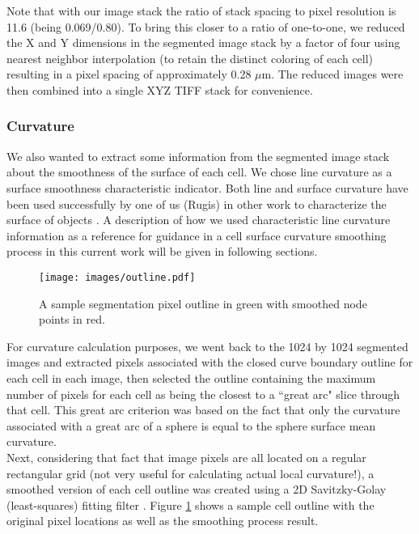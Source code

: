 \documentclass[a4paper,10pt]{article}
\begin{document}
Note that with our image stack the ratio of stack spacing to pixel resolution is 11.6 (being 0.069/0.80). To bring this closer to a ratio of one-to-one, we reduced the X and Y dimensions in the segmented image stack by a factor of four using nearest neighbor interpolation (to retain the distinct coloring of each cell) resulting in a pixel spacing of approximately 0.28 $\mu$m.  The reduced images were then combined into a single XYZ TIFF stack for convenience.\\

\subsubsection{Curvature}

We also wanted to extract some information from the segmented image stack about the smoothness of the surface of each cell. We chose line curvature as a surface smoothness characteristic indicator. Both line and surface curvature have been used successfully  by one of us (Rugis) in other work to characterize the surface of objects \cite{Rugis_2005_SCMMD, Rugis_2006_SRMRSD, Rugis_2006_SISCE}. A description of how we used characteristic line curvature information as a reference for guidance in a cell surface curvature smoothing process in this current work will be given in following sections.\\

\begin{figure}[H]
\begin{center}
\texttt{[image: images/outline.pdf]}
\end{center}
\vspace{-5mm}
\caption{A sample segmentation pixel outline in green with smoothed node points in red.}
\label{fig:slice_outline}
\end{figure}

For curvature calculation purposes, we went back to the 1024 by 1024 segmented images and extracted pixels associated with the closed curve boundary outline for each cell in each  image, then selected the outline containing the maximum number of pixels for each cell as being the closest to a ``great arc" slice through that cell. This great arc criterion was based on the fact that only the curvature associated with a great arc of a sphere is equal to the sphere surface mean curvature.\\

Next, considering that fact that image pixels are all located on a regular rectangular grid (not very useful for calculating actual local curvature!), a smoothed version of each cell outline was created using a 2D Savitzky-Golay (least-squares) fitting filter \cite{doi:10.1021/ac60214a047}. Figure \ref{fig:slice_outline} shows a sample cell outline with the original pixel locations as well as the smoothing process result.\\
\end{document}
